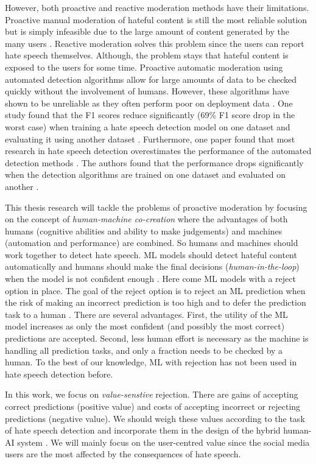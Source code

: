 However, both proactive and reactive moderation methods have their limitations. Proactive manual moderation of hateful content is still the most reliable solution but is simply infeasible due to the large amount of content generated by the many users \citep{balayn2021automatic}. Reactive moderation solves this problem since the users can report hate speech themselves. Although, the problem stays that hateful content is exposed to the users for some time. Proactive automatic moderation using automated detection algorithms allow for large amounts of data to be checked quickly without the involvement of humans. However, these algorithms have shown to be unreliable as they often perform poor on deployment data \citep{balayn2021automatic, grondahl2018all}. One study found that the F1 scores reduce significantly (69\% F1 score drop in the worst case) when training a hate speech detection model on one dataset and evaluating it using another dataset \citep{grondahl2018all}. Furthermore, one paper found that most research in hate speech detection overestimates the performance of the automated detection methods \citep{arango2019hate}. The authors found that the performance drops significantly when the detection algorithms are trained on one dataset and evaluated on another \citep{arango2019hate}.

This thesis research will tackle the problems of proactive moderation by focusing on the concept of \textit{human-machine co-creation} \citep{woo2020future} where the advantages of both humans (cognitive abilities and ability to make judgements) and machines (automation and performance) are combined. So humans and machines should work together to detect hate speech. ML models should detect hateful content automatically and humans should make the final decisions (\textit{human-in-the-loop}) when the model is not confident enough \citep{woo2020future}. Here come ML models with a reject option in place. The goal of the reject option is to reject an ML prediction when the risk of making an incorrect prediction is too high and to defer the prediction task to a human \citep{hendrickx2021machine}. There are several advantages. First, the utility of the ML model increases as only the most confident (and possibly the most correct) predictions are accepted. Second, less human effort is necessary as the machine is handling all prediction tasks, and only a fraction needs to be checked by a human. To the best of our knowledge, ML with rejection has not been used in hate speech detection before.

In this work, we focus on \textit{value-senstive} rejection. There are gains of accepting correct predictions (positive value) and costs of accepting incorrect or rejecting predictions (negative value). We should weigh these values according to the task of hate speech detection and incorporate them in the design of the hybrid human-AI system \citep{sayin2021science}. We will mainly focus on the user-centred value since the social media users are the most affected by the consequences of hate speech.

